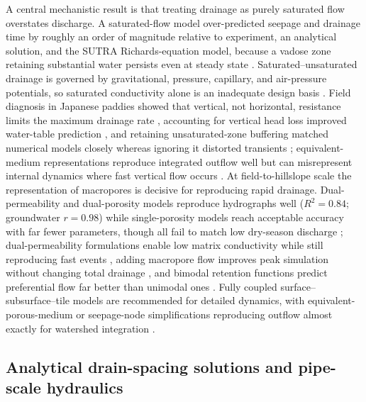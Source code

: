 A central mechanistic result is that treating drainage as purely saturated
flow overstates discharge. A saturated-flow model over-predicted seepage and
drainage time by roughly an order of magnitude relative to experiment, an
analytical solution, and the SUTRA Richards-equation model, because a vadose
zone retaining substantial water persists even at steady state
\parencite{Xin2016b}. Saturated--unsaturated drainage is governed by
gravitational, pressure, capillary, and air-pressure potentials, so saturated
conductivity alone is an inadequate design basis \parencite{Li2021}. Field
diagnosis in Japanese paddies showed that vertical, not horizontal, resistance
limits the maximum drainage rate \parencite{Nishida2020}, accounting for
vertical head loss improved water-table prediction \parencite{Talukolaee2022},
and retaining unsaturated-zone buffering matched numerical models closely
whereas ignoring it distorted transients \parencite{VandeCraats2021};
equivalent-medium representations reproduce integrated outflow well but can
misrepresent internal dynamics where fast vertical flow occurs
\parencite{Carlier2007}. At field-to-hillslope scale the representation of
macropores is decisive for reproducing rapid drainage. Dual-permeability and
dual-porosity models reproduce hydrographs well ($R^2=0.84$; groundwater
$r=0.98$) while single-porosity models reach acceptable accuracy with far
fewer parameters, though all fail to match low dry-season discharge
\parencite{Varvaris2018}; dual-permeability formulations enable low matrix
conductivity while still reproducing fast events
\parencite{Warsta2014,Salo2017,Koivusalo1999}, adding macropore flow improves
peak simulation without changing total drainage \parencite{Zhou2013}, and
bimodal retention functions predict preferential flow far better than unimodal
ones \parencite{Mohanty1997}. Fully coupled surface--subsurface--tile models
are recommended for detailed dynamics, with equivalent-porous-medium or
seepage-node simplifications reproducing outflow almost exactly for watershed
integration \parencite{DeSchepper2015,Boico2022,Xian2017}.

\subsection{Analytical drain-spacing solutions and pipe-scale hydraulics}

